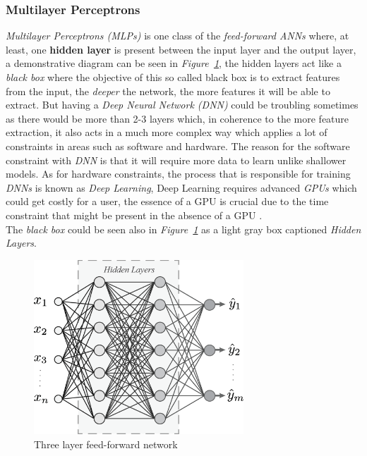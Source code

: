 \documentclass[12pt]{extarticle}
\begin{document}
	
	\subsubsection{Multilayer Perceptrons}\label{MLP}
	\emph{Multilayer Perceptrons (MLPs)} is one class of the \emph{feed-forward ANNs} where, at least, one \textbf{hidden layer} is present between the input layer and the output layer, a demonstrative diagram can be seen in \emph{Figure~\ref{fig:MLP}}, the hidden layers act like a \emph{black box} where the objective of this so called black box is to extract features from the input, the \emph{deeper} the network, the more features it will be able to extract. But having a \emph{Deep Neural Network (DNN)} could be troubling sometimes as there would be more than 2-3 layers which, in coherence to the more feature extraction, it also acts in a much more complex way which applies a lot of constraints in areas such as software and hardware. The reason for the software constraint with \emph{DNN} is that it will require more data to learn unlike shallower models. As for hardware constraints, the process that is responsible for training \emph{DNNs} is known as \emph{Deep Learning}, Deep Learning requires advanced \emph{GPUs} which could get costly for a user, the essence of a GPU is crucial due to the time constraint that might be present in the absence of a GPU \cite{GPU}. \\[5mm]
	The \emph{black box} could be seen also in \emph{Figure~\ref{fig:MLP}} as a light gray box captioned \emph{Hidden Layers}. 
	
	\begin{figure}[h]
		\centering
		\includegraphics[width=0.7\textwidth]{pics/Figures/MLP.eps}
		\caption{\small{Three layer feed-forward network}}
		\label{fig:MLP}
	\end{figure}
	
\end{document}
